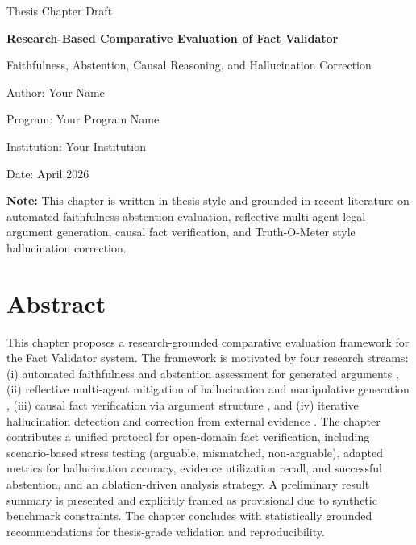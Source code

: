 \documentclass[12pt,a4paper,oneside]{report}
\begin{document}
\begin{titlepage}
\centering
\vspace*{2cm}
{\Large Thesis Chapter Draft \par}
\vspace{1.2cm}
{\LARGE \textbf{Research-Based Comparative Evaluation of Fact Validator}\par}
\vspace{0.6cm}
{\Large Faithfulness, Abstention, Causal Reasoning, and Hallucination Correction\par}
\vspace{2cm}

{\large Author: Your Name\par}
\vspace{0.4cm}
{\large Program: Your Program Name\par}
\vspace{0.4cm}
{\large Institution: Your Institution\par}
\vspace{0.4cm}
{\large Date: April 2026\par}

\vfill
\begin{minipage}{0.9\textwidth}
\small
\textbf{Note:} This chapter is written in thesis style and grounded in recent literature on automated faithfulness-abstention evaluation, reflective multi-agent legal argument generation, causal fact verification, and Truth-O-Meter style hallucination correction.
\end{minipage}
\end{titlepage}

\chapter*{Abstract}

This chapter proposes a research-grounded comparative evaluation framework for the Fact Validator system.
The framework is motivated by four research streams: (i) automated faithfulness and abstention assessment for generated arguments \citep{zhang2025faithfulness}, (ii) reflective multi-agent mitigation of hallucination and manipulative generation \citep{zhang2025reflective}, (iii) causal fact verification via argument structure \citep{si2024checkwhy}, and (iv) iterative hallucination detection and correction from external evidence \citep{galitsky2023truthometer,galitsky2023repo}.
The chapter contributes a unified protocol for open-domain fact verification, including scenario-based stress testing (arguable, mismatched, non-arguable), adapted metrics for hallucination accuracy, evidence utilization recall, and successful abstention, and an ablation-driven analysis strategy.
A preliminary result summary is presented and explicitly framed as provisional due to synthetic benchmark constraints.
The chapter concludes with statistically grounded recommendations for thesis-grade validation and reproducibility.
\end{document}
